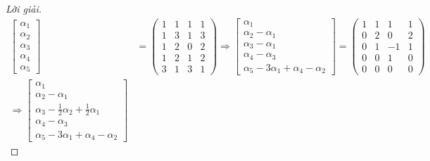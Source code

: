 \documentclass[class=linearalgebra,crop=false]{standalone}
\begin{document}
\begin{proof}[Lời giải]
    \begin{align*}
        \begin{bmatrix}
            \alpha_{1} \\
            \alpha_{2} \\
            \alpha_{3} \\
            \alpha_{4} \\
            \alpha_{5}
        \end{bmatrix}                                           & =
        \begin{pmatrix}
            1 & 1 & 1 & 1 \\
            1 & 3 & 1 & 3 \\
            1 & 2 & 0 & 2 \\
            1 & 2 & 1 & 2 \\
            3 & 1 & 3 & 1
        \end{pmatrix}
        \Longrightarrow
        \begin{bmatrix}
            \alpha_{1}            \\
            \alpha_{2}-\alpha_{1} \\
            \alpha_{3}-\alpha_{1} \\
            \alpha_{4}-\alpha_{3} \\
            \alpha_{5}-3\alpha_{1}+\alpha_{4}-\alpha_{2}
        \end{bmatrix}=
        \begin{pmatrix}
            1 & 1 & 1  & 1 \\
            0 & 2 & 0  & 2 \\
            0 & 1 & -1 & 1 \\
            0 & 0 & 1  & 0 \\
            0 & 0 & 0  & 0
        \end{pmatrix}                                              \\
        \Longrightarrow
        \begin{bmatrix}
            \alpha_{1}                                             \\
            \alpha_{2}-\alpha_{1}                                  \\
            \alpha_{3}-\frac{1}{2}\alpha_{2}+\frac{1}{2}\alpha_{1} \\
            \alpha_{4} - \alpha_{3}                                \\
            \alpha_{5} - 3\alpha_{1} + \alpha_{4} - \alpha_{2}

\end{bmatrix}
\end{align*}
\end{proof}
\end{document}
